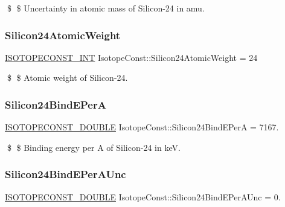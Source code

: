 \$ \$ Uncertainty in atomic mass of Silicon-\/24 in amu. \mbox{\label{group___isotope_const-_silicon-_si24_gab5df772d31bd0070e0a5b540f0d73e88}} 
\subsubsection{\texorpdfstring{Silicon24\+Atomic\+Weight}{Silicon24AtomicWeight}}
{\footnotesize\ttfamily \mbox{\hyperlink{group___isotope_const-_macros_ga5f18360b3e99483a35c32d789e62621c}{I\+S\+O\+T\+O\+P\+E\+C\+O\+N\+S\+T\+\_\+\+I\+NT}} Isotope\+Const\+::\+Silicon24\+Atomic\+Weight = 24}

\$ \$ Atomic weight of Silicon-\/24. \mbox{\label{group___isotope_const-_silicon-_si24_ga895c4daf17f1fc7602898ea395a4fe64}} 
\subsubsection{\texorpdfstring{Silicon24\+Bind\+E\+PerA}{Silicon24BindEPerA}}
{\footnotesize\ttfamily \mbox{\hyperlink{group___isotope_const-_macros_ga8f45a7272ce02c0b4c65c44636ed719a}{I\+S\+O\+T\+O\+P\+E\+C\+O\+N\+S\+T\+\_\+\+D\+O\+U\+B\+LE}} Isotope\+Const\+::\+Silicon24\+Bind\+E\+PerA = 7167.}

\$ \$ Binding energy per A of Silicon-\/24 in keV. \mbox{\label{group___isotope_const-_silicon-_si24_gacd5f035df79a6edde42acceced926c34}} 
\subsubsection{\texorpdfstring{Silicon24\+Bind\+E\+Per\+A\+Unc}{Silicon24BindEPerAUnc}}
{\footnotesize\ttfamily \mbox{\hyperlink{group___isotope_const-_macros_ga8f45a7272ce02c0b4c65c44636ed719a}{I\+S\+O\+T\+O\+P\+E\+C\+O\+N\+S\+T\+\_\+\+D\+O\+U\+B\+LE}} Isotope\+Const\+::\+Silicon24\+Bind\+E\+Per\+A\+Unc = 0.}

